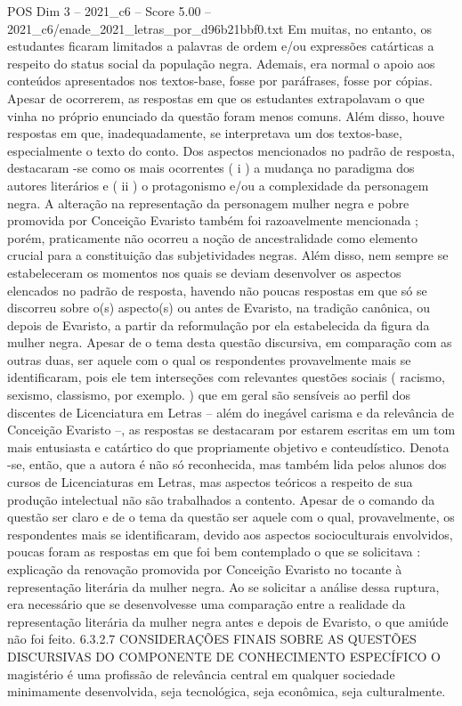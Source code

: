 \begin{textsample}{POS Dim 3 – 2021\_c6 – Score 5.00 – 2021\_c6/enade\_2021\_letras\_por\_d96b21bbf0.txt}
Em muitas, no entanto, os estudantes ficaram limitados a palavras de ordem e/ou expressões catárticas a respeito do status social da população negra.
Ademais, era normal o apoio aos conteúdos apresentados nos textos-base, fosse por paráfrases, fosse por cópias.
Apesar de ocorrerem, as respostas em que os estudantes extrapolavam o que vinha no próprio enunciado da questão foram menos comuns.
Além disso, houve respostas em que, inadequadamente, se interpretava um dos textos-base, especialmente o texto do conto.
Dos aspectos mencionados no padrão de resposta, destacaram -se como os mais ocorrentes ( i ) a mudança no paradigma dos autores literários e ( ii ) o protagonismo e/ou a complexidade da personagem negra.
A alteração na representação da personagem mulher negra e pobre promovida por Conceição Evaristo também foi razoavelmente mencionada ; porém, praticamente não ocorreu a noção de ancestralidade como elemento crucial para a constituição das subjetividades negras.
Além disso, nem sempre se estabeleceram os momentos nos quais se deviam desenvolver os aspectos elencados no padrão de resposta, havendo não poucas respostas em que só se discorreu sobre o(s) aspecto(s) ou antes de Evaristo, na tradição canônica, ou depois de Evaristo, a partir da reformulação por ela estabelecida da figura da mulher negra.
Apesar de o tema desta questão discursiva, em comparação com as outras duas, ser aquele com o qual os respondentes provavelmente mais se identificaram, pois ele tem interseções com relevantes questões sociais ( racismo, sexismo, classismo, por exemplo. ) que em geral são sensíveis ao perfil dos discentes de Licenciatura em Letras – além do inegável carisma e da relevância de Conceição Evaristo –, as respostas se destacaram por estarem escritas em um tom mais entusiasta e catártico do que propriamente objetivo e conteudístico.
Denota -se, então, que a autora é não só reconhecida, mas também lida pelos alunos dos cursos de Licenciaturas em Letras, mas aspectos teóricos a respeito de sua produção intelectual não são trabalhados a contento.
Apesar de o comando da questão ser claro e de o tema da questão ser aquele com o qual, provavelmente, os respondentes mais se identificaram, devido aos aspectos socioculturais envolvidos, poucas foram as respostas em que foi bem contemplado o que se solicitava : explicação da renovação promovida por Conceição Evaristo no tocante à representação literária da mulher negra.
Ao se solicitar a análise dessa ruptura, era necessário que se desenvolvesse uma comparação entre a realidade da representação literária da mulher negra antes e depois de Evaristo, o que amiúde não foi feito. 6.3.2.7 CONSIDERAÇÕES FINAIS SOBRE AS QUESTÕES DISCURSIVAS DO COMPONENTE DE CONHECIMENTO ESPECÍFICO O magistério é uma profissão de relevância central em qualquer sociedade minimamente desenvolvida, seja tecnológica, seja econômica, seja culturalmente.

\end{textsample}
